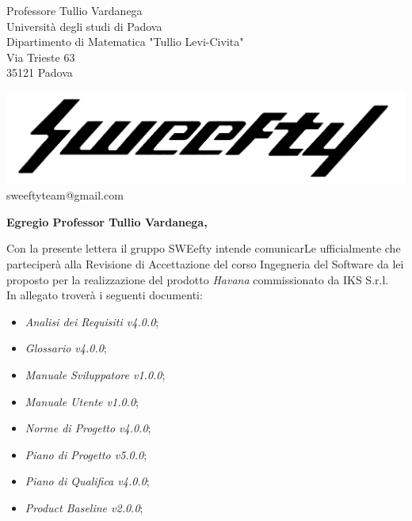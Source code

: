 \documentclass[12pt]{letter} %
\date{16/04/2018} %
\begin{document}



\begin{letter}{Professore Tullio Vardanega \\ Università degli studi di Padova \\ Dipartimento di Matematica "Tullio Levi-Civita" \\ Via Trieste 63 \\ 35121 Padova} %

\begin{center}
\includegraphics[width=\linewidth]{../../CommonImages/logo.jpg}
sweeftyteam@gmail.com
\end{center}

\opening{\textbf{Egregio Professor Tullio Vardanega,}}
\begin{addmargin}[2em]{2em}
  \hspace{1cm} Con la presente lettera il gruppo SWEefty intende comunicarLe ufficialmente che parteciperà alla Revisione di Accettazione del corso Ingegneria del Software da lei proposto per la realizzazione del prodotto \emph{Havana} commissionato da IKS S.r.l.\\
  In allegato troverà i seguenti documenti:
      \begin{itemize}
      \item \emph{Analisi dei Requisiti v4.0.0};
      \item \emph{Glossario v4.0.0};
      \item \emph{Manuale Sviluppatore v1.0.0};
      \item \emph{Manuale Utente v1.0.0};
      \item \emph{Norme di Progetto v4.0.0};
      \item \emph{Piano di Progetto v5.0.0};
      \item \emph{Piano di Qualifica v4.0.0};
      \item \emph{Product Baseline v2.0.0};


\end{itemize}
\end{addmargin}
\end{letter}
\end{document}

